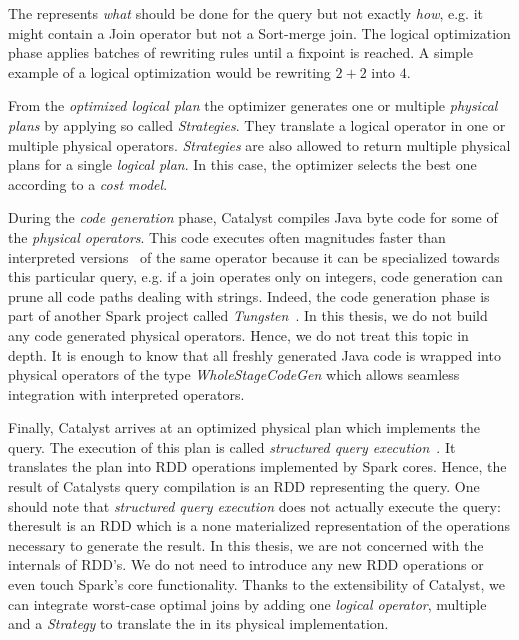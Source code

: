 The  represents \textit{what} should be done for the query but not exactly \textit{how},
e.g. it might contain a Join operator but not a Sort-merge join.
The logical optimization phase applies batches of rewriting rules until a fixpoint is reached.
A simple example of a logical optimization would be rewriting $2 + 2$ into $4$.

From the \textit{optimized logical plan} the optimizer generates one or multiple \textit{physical plans} by
applying so called \textit{Strategies}.
They translate a logical operator in one or multiple physical operators.
\textit{Strategies} are also allowed to return multiple physical plans for a single \textit{logical plan}.
In this case, the optimizer selects the best one according to a \textit{cost model}.

During the \textit{code generation} phase, Catalyst compiles Java byte code for some of the \textit{physical
operators}.
This code executes often magnitudes faster than interpreted versions~\cite{catalyst} of the same operator because
it can be specialized towards this particular query, e.g. if a join operates only on integers, code
generation can prune all code paths dealing with strings.
Indeed, the code generation phase is part of another Spark project called \textit{Tungsten}~\cite{tungsten}.
In this thesis, we do not build any code generated physical operators.
Hence, we do not treat this topic in depth.
It is enough to know that all freshly generated Java code is wrapped into physical operators of the type \textit{WholeStageCodeGen}
which allows seamless integration with interpreted operators.

Finally, Catalyst arrives at an optimized physical plan which implements the query.
The execution of this plan is called
\textit{structured query execution}~\cite{spark-internals-structured-query-execution}.
It translates the plan into RDD operations implemented by Spark cores.
Hence, the result of Catalysts query compilation is an RDD representing the query.
One should note that \textit{structured query execution} does not actually execute the query: theresult is an RDD which is a none materialized representation of the operations necessary to generate the
result.
In this thesis, we are not concerned with the internals of RDD's.
We do not need to introduce any new RDD operations or even touch Spark's core functionality.
Thanks to the extensibility of Catalyst, we can integrate worst-case optimal joins by adding one \textit{logical operator}, multiple
 and a \textit{Strategy} to translate the  in
its physical implementation.

